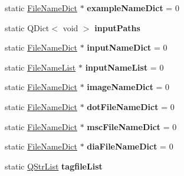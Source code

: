 \begin{DoxyCompactItemize}
\item 
\hypertarget{class_doxygen_a2eb3c990b5afe1bd3d8d5b89d23413b3}{static \hyperlink{class_file_name_dict}{File\-Name\-Dict} $\ast$ {\bfseries example\-Name\-Dict} = 0}\label{class_doxygen_a2eb3c990b5afe1bd3d8d5b89d23413b3}

\item 
\hypertarget{class_doxygen_a027de66f674b57b526767dc4698531bb}{static Q\-Dict$<$ void $>$ {\bfseries input\-Paths}}\label{class_doxygen_a027de66f674b57b526767dc4698531bb}

\item 
\hypertarget{class_doxygen_a1a7e96c076a3e01b3ae371953b853441}{static \hyperlink{class_file_name_dict}{File\-Name\-Dict} $\ast$ {\bfseries input\-Name\-Dict} = 0}\label{class_doxygen_a1a7e96c076a3e01b3ae371953b853441}

\item 
\hypertarget{class_doxygen_aae2878ecb51cc6a3a82a53406d7ece85}{static \hyperlink{class_file_name_list}{File\-Name\-List} $\ast$ {\bfseries input\-Name\-List} = 0}\label{class_doxygen_aae2878ecb51cc6a3a82a53406d7ece85}

\item 
\hypertarget{class_doxygen_afeea1d4892ed5a394fd792f98478c450}{static \hyperlink{class_file_name_dict}{File\-Name\-Dict} $\ast$ {\bfseries image\-Name\-Dict} = 0}\label{class_doxygen_afeea1d4892ed5a394fd792f98478c450}

\item 
\hypertarget{class_doxygen_a5c093a4bc682b54ff16f6a130ce3e625}{static \hyperlink{class_file_name_dict}{File\-Name\-Dict} $\ast$ {\bfseries dot\-File\-Name\-Dict} = 0}\label{class_doxygen_a5c093a4bc682b54ff16f6a130ce3e625}

\item 
\hypertarget{class_doxygen_a5f7f8e642e1e190171783b0ec7f95bac}{static \hyperlink{class_file_name_dict}{File\-Name\-Dict} $\ast$ {\bfseries msc\-File\-Name\-Dict} = 0}\label{class_doxygen_a5f7f8e642e1e190171783b0ec7f95bac}

\item 
\hypertarget{class_doxygen_af2f235dd1f4edab83adf20874924fd34}{static \hyperlink{class_file_name_dict}{File\-Name\-Dict} $\ast$ {\bfseries dia\-File\-Name\-Dict} = 0}\label{class_doxygen_af2f235dd1f4edab83adf20874924fd34}

\item 
\hypertarget{class_doxygen_a7aa96cd3c04b89fd541ea01af596a50f}{static \hyperlink{class_q_str_list}{Q\-Str\-List} {\bfseries tagfile\-List}}\label{class_doxygen_a7aa96cd3c04b89fd541ea01af596a50f}


\end{DoxyCompactItemize}
